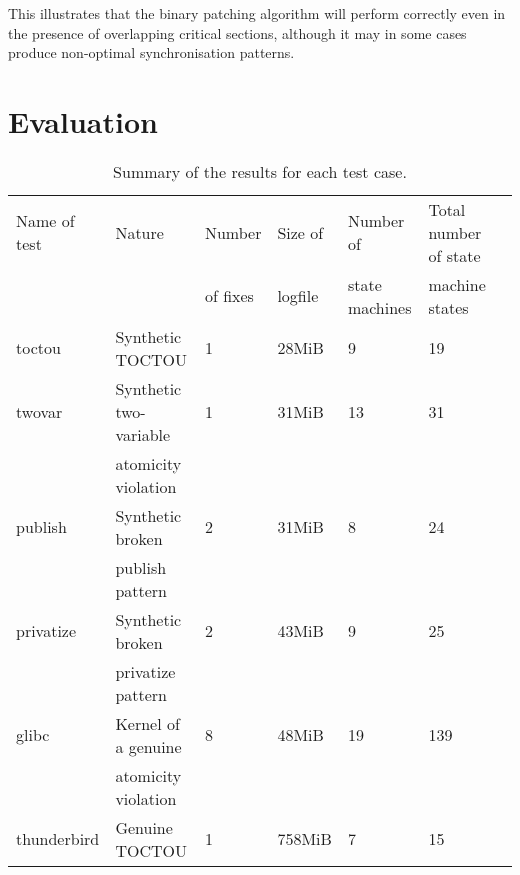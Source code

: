\documentclass[10pt,twocolumn,preprint,natbib,authoryear]{sigplanconf}
\begin{document}
This illustrates that the binary patching algorithm will perform
correctly even in the presence of overlapping critical sections,
although it may in some cases produce non-optimal synchronisation
patterns.

\section{Evaluation}
\label{sect:evaluation}

\begin{table*}
\begin{tabular}{lllllll}
Name of test & Nature                 & Number   & Size of & Number of      & Total number of state\\
             &                        & of fixes & logfile & state machines & machine states\\ \hline
toctou       & Synthetic TOCTOU       & 1        & 28MiB   & 9 & 19\\
twovar       & Synthetic two-variable & 1        & 31MiB   & 13 & 31\\
             & atomicity violation    &          & \\
publish      & Synthetic broken       & 2        & 31MiB   & 8 & 24 \\
             & publish pattern        &          & \\
privatize    & Synthetic broken       & 2        & 43MiB   & 9 & 25 \\
             & privatize pattern      &          & \\
\hline
glibc        & Kernel of a genuine    & 8        & 48MiB   & 19 & 139\\
             & atomicity violation    &          & \\
\hline
thunderbird  & Genuine TOCTOU         & 1        & 758MiB  & 7 & 15
\end{tabular}
\caption{Summary of the results for each test case.}
\label{tab:output_summary}
\end{table*}
\end{document}
